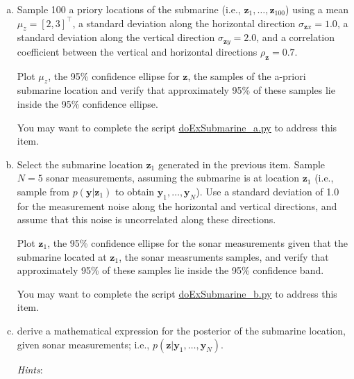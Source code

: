 \documentclass[12pt]{article}
\begin{document}
\begin{enumerate}[(a)]

    \item Sample 100 a priory locations of the submarine
        (i.e., $\mathbf{z}_1,\ldots,\mathbf{z}_{100}$) using
        a mean $\mu_z=[2,3]^\intercal$, a standard deviation along the
        horizontal direction $\sigma_{\mathbf{z}x}=1.0$, a standard
        deviation along the vertical direction $\sigma_{\mathbf{z}y}=2.0$,
        and a correlation coefficient between the vertical and horizontal
        directions $\rho_{\mathbf{z}}=0.7$.

        Plot $\mu_z$, the 95\% confidence ellipse for $\mathbf{z}$, the samples
        of the a-priori submarine location and verify that approximately 95\%
        of these samples lie inside the 95\% confidence ellipse.

        You may want to complete the script
        \href{http://github.com/joacorapela/gcnu\_bridging2023}{doExSubmarine\_a.py}
        to address this item.

    \item Select the submarine location $\mathbf{z}_1$ generated in
        the previous item. Sample $N=5$ sonar measurements, assuming the
        submarine is at location $\mathbf{z}_1$ (i.e., sample from
        $p(\mathbf{y}|\mathbf{z}_1)$ to obtain
        $\mathbf{y}_1,\ldots,\mathbf{y}_N$). Use a standard deviation of
        1.0 for the measurement noise along the horizontal and vertical
        directions, and assume that this noise is uncorrelated along these
        directions.

        Plot $\mathbf{z}_1$, the 95\% confidence ellipse for the sonar
        measurements given that the submarine located at $\mathbf{z}_1$, the
        sonar measruments samples, and verify that approximately 95\% of these
        samples lie inside the 95\% confidence band.

        You may want to complete the script
        \href{http://github.com/joacorapela/gcnu\_bridging2023}{doExSubmarine\_b.py}
        to address this item.

    \item derive a mathematical expression for the posterior of the
        submarine location, given sonar measurements; i.e.,
        $p(\mathbf{z}|\mathbf{y}_1,\ldots,\mathbf{y}_N)$.

        \textit{Hints}: 

        \begin{itemize}


\end{itemize}
\end{enumerate}
\end{document}
